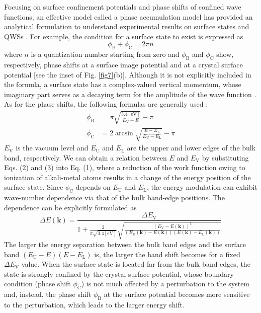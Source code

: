 \documentclass[reprint,secnumarabic,amssymb, nobibnotes, aps, prl,superscriptaddress,showpacs]{revtex4-1}
\begin{document}
Focusing on surface confinement potentials and phase shifts of confined wave functions, an effective model called a phase accumulation model has provided an analytical formulation to understand experimental results on surface states and QWSs \cite{hirahara2007, ito2016,chiang2000,smith1985,smith1994,neuhold1997,matsuda2002, davison1992,hufner2013}. For example, the condition for a surface state to exist is expressed as
\begin{equation}
	\phi_\mathrm{B}+\phi_\mathrm{C}=2\pi n
\end{equation}
where $n$ is a quantization number starting from zero and $\phi_\mathrm{B}$ and $\phi_\mathrm{C}$ show, respectively, phase shifts at a surface image potential and at a crystal surface potential [see the inset of Fig. \ref{fig7}(b)]. Although it is not explicitly included in the formula, a surface state has a complex-valued vertical momentum, whose imaginary part serves as a decaying term for the amplitude of the wave function \cite{davison1992, hufner2013}. As for the phase shifts, the following formulas are generally used \cite{smith1985,smith1994}:
\begin{align}
	\phi_\mathrm{B}&=\pi\sqrt{\frac{\mathrm{3.4 [eV]}}{E_\mathrm{V}-E}}-\pi \\
	\phi_\mathrm{C}&=2\arcsin\sqrt{{\frac{E-E_\mathrm{L}}{E_\mathrm{U}-E_\mathrm{L}}}}-\pi
\end{align}
$E_\mathrm{V}$ is the vacuum level and $E_\mathrm{U}$ and $E_\mathrm{L}$ are the upper and lower edges of the bulk band, respectively. We can obtain a relation between $E$ and $E_\mathrm{V}$ by substituting Eqs. (2) and (3) into Eq. (1), where a reduction of the work function owing to ionization of alkali-metal atoms results in a change of the energy position of the surface state. Since $\phi_\mathrm{C}$ depends on $E_\mathrm{U}$ and $E_\mathrm{L}$, the energy modulation can exhibit wave-number dependence via that of the bulk band-edge positions. The dependence can be explicitly formulated as
\begin{equation}
	\Delta E(\bm{k})=\frac{\Delta E_\mathrm{V}}{1+\frac{2}{\pi\sqrt{\mathrm{3.4 [eV]}}}\sqrt{\frac{(E_\mathrm{V}-E(\bm{k}))^3}{(E_\mathrm{U}(\bm{k})-E(\bm{k}))(E(\bm{k})-E_\mathrm{L}(\bm{k}))}}}
\end{equation}
The larger the energy separation between the bulk band edges and the surface band $(E_\mathrm{U}-E)(E-E_\mathrm{L})$ is, the larger the band shift becomes for a fixed $\Delta E_\mathrm{V}$ value. When the surface state is located far from the bulk band edges, the state is strongly confined by the crystal surface potential, whose boundary condition (phase shift $\phi_\mathrm{C}$) is not much affected by a perturbation to the system and, instead, the phase shift $\phi_\mathrm{B}$ at the surface potential becomes more sensitive to the perturbation, which leads to the larger energy shift.
\end{document}
